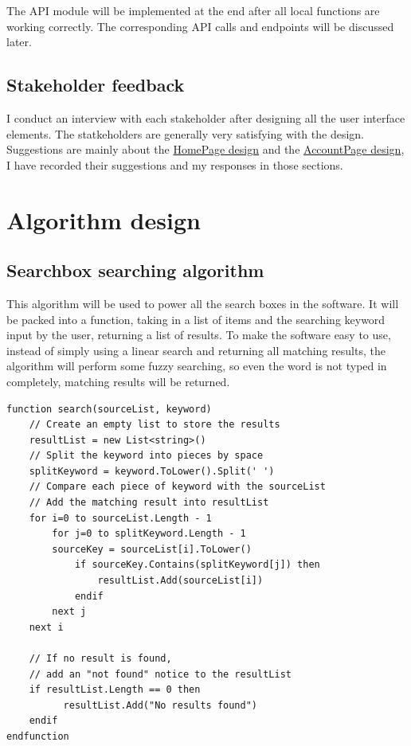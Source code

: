 \documentclass[a4paper]{report}
\begin{document}
The API module will be implemented at the end after all local functions are working correctly. The corresponding API calls and endpoints will be discussed later.

\subsection{Stakeholder feedback}

I conduct an interview with each stakeholder after designing all the user interface elements. The statkeholders are generally very satisfying with the design. Suggestions are mainly about the \hyperref[subsubsec:homepage stakeholder feedback]{HomePage design} and the \hyperref[subsubsec:accountpage stakeholder feedback]{AccountPage design}, I have recorded their suggestions and my responses in those sections.

\section{Algorithm design}
\label{sec:algorithm design}

\subsection{Searchbox searching algorithm}

This algorithm will be used to power all the search boxes in the software. It will be packed into a function, taking in a list of items and the searching keyword input by the user, returning a list of results. To make the software easy to use, instead of simply using a linear search and returning all matching results, the algorithm will perform some fuzzy searching, so even the word is not typed in completely, matching results will be returned.

\begin{verbatim}
function search(sourceList, keyword)
    // Create an empty list to store the results
    resultList = new List<string>()
    // Split the keyword into pieces by space
    splitKeyword = keyword.ToLower().Split(' ')
    // Compare each piece of keyword with the sourceList
    // Add the matching result into resultList
    for i=0 to sourceList.Length - 1
        for j=0 to splitKeyword.Length - 1
        sourceKey = sourceList[i].ToLower()
            if sourceKey.Contains(splitKeyword[j]) then
                resultList.Add(sourceList[i])
            endif
        next j
    next i

    // If no result is found,
    // add an "not found" notice to the resultList
    if resultList.Length == 0 then
          resultList.Add("No results found")
    endif
endfunction
\end{verbatim}
\end{document}
